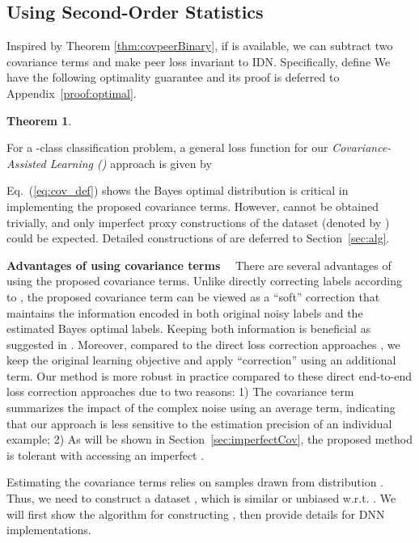\documentclass[final]{cvpr}
\newtheorem{theorem}{Theorem}
\newcommand{\covpeer}{\text{CAL}}
\begin{document}
\subsection{Using Second-Order Statistics}

Inspired by Theorem \ref{thm:covpeerBinary}, if  is available, we can subtract two covariance terms and make peer loss invariant to IDN.
Specifically, define 
{\small
}
We have the following optimality guarantee and its proof is deferred to Appendix~\ref{proof:optimal}. \begin{theorem}
\label{thm:optimal}

\end{theorem}

For a -class classification problem, a general loss function for our \textit{Covariance-Assisted Learning (\covpeer{})} approach is given by

Eq.~(\ref{eq:cov_def}) shows the Bayes optimal distribution  is critical in implementing the proposed covariance terms.
However,  cannot be obtained trivially, and only imperfect proxy constructions of the dataset (denoted by ) could be expected.
Detailed constructions of  are deferred to Section~\ref{sec:alg}. 


\noindent\textbf{Advantages of using covariance terms}~~
There are several advantages of using the proposed covariance terms.
Unlike directly correcting labels according to , the proposed covariance term can be viewed as a ``soft'' correction that maintains the information encoded in both original noisy labels and the estimated Bayes optimal labels.
Keeping both information is beneficial as suggested in \cite{han2019deep}.
Moreover, compared to the direct loss correction approaches \cite{Patrini_2017_CVPR,xia2020parts,xia2019anchor}, we keep the original learning objective and apply ``correction'' using an additional term.
Our method is more robust in practice compared to these direct end-to-end loss correction approaches due to two reasons: 
1) The covariance term summarizes the impact of the complex noise using an average term, indicating that our approach is less sensitive to the estimation precision of an individual example; 2) As will be shown in Section~\ref{sec:imperfectCov}, the proposed method is tolerant with accessing an imperfect .





Estimating the covariance terms relies on samples drawn from distribution .
Thus, we need to construct a dataset , which is similar or unbiased w.r.t. .
We will first show the algorithm for constructing , then provide details for DNN implementations.
\end{document}
